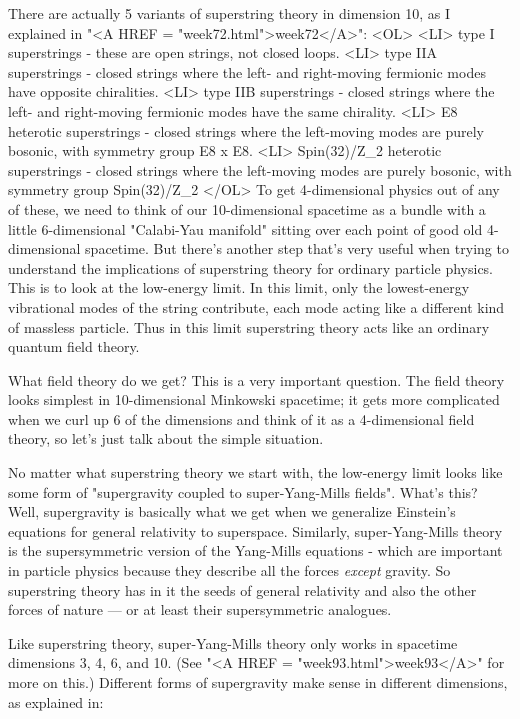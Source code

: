 There are actually 5 variants of superstring theory in dimension 10, as
I explained in "<A HREF = "week72.html">week72</A>":
<OL>
<LI> type I superstrings - these are open strings, not closed loops.
<LI> type IIA superstrings - closed strings where the left- and
   right-moving fermionic modes have opposite chiralities.
<LI> type IIB superstrings - closed strings where the left- and
   right-moving fermionic modes have the same chirality.
<LI> E8 heterotic superstrings - closed strings where the left-moving
   modes are purely bosonic, with symmetry group E8 x E8.
<LI> Spin(32)/Z_{2} heterotic superstrings - closed strings where the 
   left-moving modes are purely bosonic, with symmetry group Spin(32)/Z_{2}
</OL>
To get 4-dimensional physics out of any of these, we need to think of our
10-dimensional spacetime as a bundle with a little 6-dimensional
"Calabi-Yau manifold" sitting over each point of good old 4-dimensional
spacetime.  But there's another step that's very useful when trying to
understand the implications of superstring theory for ordinary particle
physics.  This is to look at the low-energy limit.  In this limit, only
the lowest-energy vibrational modes of the string contribute, each mode
acting like a different kind of massless particle.  Thus in this limit
superstring theory acts like an ordinary quantum field theory.  

What field theory do we get?  This is a very important question.  The
field theory looks simplest in 10-dimensional Minkowski spacetime; it
gets more complicated when we curl up 6 of the dimensions and think of
it as a 4-dimensional field theory, so let's just talk about the simple
situation.  

No matter what superstring theory we start with, the low-energy limit
looks like some form of "supergravity coupled to super-Yang-Mills
fields".  What's this?  Well, supergravity is basically what we get when
we generalize Einstein's equations for general relativity to superspace.
Similarly, super-Yang-Mills theory is the supersymmetric version of the
Yang-Mills equations - which are important in particle physics because
they describe all the forces \emph{except} gravity.  So superstring theory
has in it the seeds of general relativity and also the other forces of
nature --- or at least their supersymmetric analogues.

Like superstring theory, super-Yang-Mills theory only works in spacetime
dimensions 3, 4, 6, and 10.  (See "<A HREF = "week93.html">week93</A>" for more on this.)  Different
forms of supergravity make sense in different dimensions, as explained
in: 

